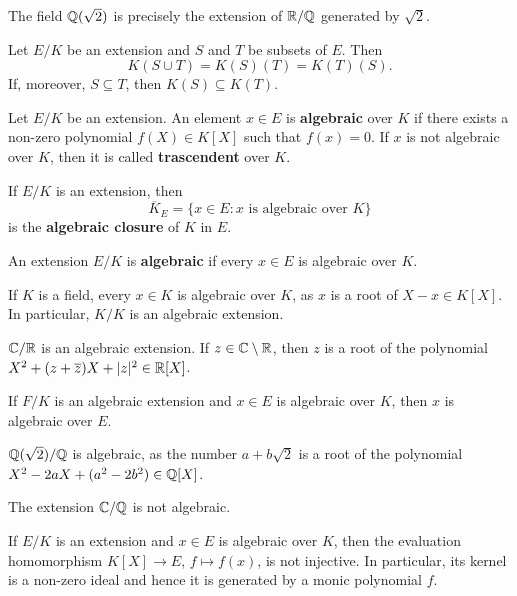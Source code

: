 \begin{example}
	The field $\mathbb{Q}(\sqrt{2})$ is precisely the extension 
	of $\mathbb{R}/\mathbb{Q}$ generated by $\sqrt{2}$. 
\end{example}

Let $E/K$ be an extension and $S$ and $T$ be subsets of $E$.
Then 
\[
	K(S\cup T)=K(S)(T)=K(T)(S).
\]
If, moreover, 
$S\subseteq T$, then $K(S)\subseteq K(T)$. 


\begin{definition}
	Let $E/K$ be an extension. An element $x\in E$
	is \textbf{algebraic} over $K$ if there
	exists a non-zero polynomial 
	$f(X)\in K[X]$ such that $f(x)=0$. If $x$ is
	not algebraic over $K$, 
	then it is called \textbf{trascendent} over $K$.
\end{definition}

If $E/K$ is an extension, then 
\[
	\overline{K}_E=\{x\in E:x\text{ is algebraic over }K\}
\]
is the \textbf{algebraic closure} of $K$ in $E$. 

\begin{definition}	
	An extension $E/K$ is \textbf{algebraic} if 
	every $x\in E$ is algebraic over $K$. 
\end{definition}

If $K$ is a field, every $x\in K$ is algebraic over $K$,
as $x$ is a root of $X-x\in K[X]$. In particular, $K/K$ is
an algebraic extension. 

\begin{example}
	$\mathbb{C}/\mathbb{R}$ is an algebraic extension. If $z\in\mathbb{C}\setminus\mathbb{R}$, then
	$z$ is a root of the polynomial 
	$X^2+(z+\overline{z})X+|z|^2\in\mathbb{R}[X]$. 
\end{example}

If $F/K$ is an algebraic extension and $x\in E$ is algebraic
over $K$, then $x$ is algebraic over $E$. 

\begin{example}
	$\mathbb{Q}(\sqrt{2})/\mathbb{Q}$ is algebraic, as the number
	$a+b\sqrt{2}$ is a root of the polynomial
	$X^2-2aX+(a^2-2b^2)\in\mathbb{Q}[X]$. 
\end{example}

The extension $\mathbb{C}/\mathbb{Q}$ is not algebraic. 

If $E/K$ is an extension and $x\in E$ is algebraic
over $K$, then the evaluation homomorphism 
$K[X]\to E$, $f\mapsto f(x)$, is not injective. In particular,
its kernel is a non-zero ideal and hence 
it is generated by a monic polynomial $f$. 


